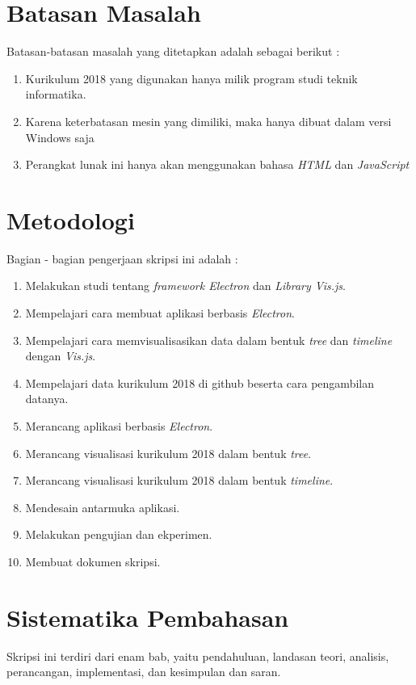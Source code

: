 \section{Batasan Masalah}
\label{sec:batasan}
Batasan-batasan masalah yang ditetapkan adalah sebagai berikut :
\begin{enumerate}
    \item Kurikulum 2018 yang digunakan hanya milik program studi teknik informatika.
    \item Karena keterbatasan mesin yang dimiliki, maka hanya dibuat dalam versi Windows saja
    \item Perangkat lunak ini hanya akan menggunakan bahasa \textit{HTML} dan \textit{JavaScript}
\end{enumerate}



\section{Metodologi}
\label{sec:metlit}
Bagian - bagian pengerjaan skripsi ini adalah :
\begin{enumerate}
    \item Melakukan studi tentang \textit{framework Electron} dan \textit{Library Vis.js}.
    \item Mempelajari cara membuat aplikasi berbasis \textit{Electron}.
    \item Mempelajari cara memvisualisasikan data dalam bentuk \textit{tree} dan \textit{timeline} dengan \textit{Vis.js}.
    \item Mempelajari data kurikulum 2018 di github beserta cara pengambilan datanya.
    \item Merancang aplikasi berbasis \textit{Electron}.
    \item Merancang visualisasi kurikulum 2018 dalam bentuk \textit{tree}.
    \item Merancang visualisasi kurikulum 2018 dalam bentuk \textit{timeline}.
    \item Mendesain antarmuka aplikasi.
    \item Melakukan pengujian dan ekperimen.
    \item Membuat dokumen skripsi.
\end{enumerate}



\section{Sistematika Pembahasan}
\label{sec:sispem}
Skripsi ini terdiri dari enam bab, yaitu pendahuluan, landasan teori, analisis, perancangan, implementasi, dan kesimpulan dan saran. 

